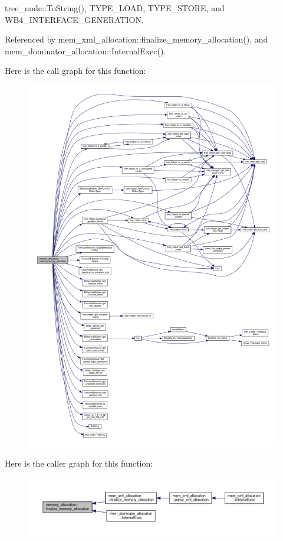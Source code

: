 tree\+\_\+node\+::\+To\+String(), T\+Y\+P\+E\+\_\+\+L\+O\+AD, T\+Y\+P\+E\+\_\+\+S\+T\+O\+RE, and W\+B4\+\_\+\+I\+N\+T\+E\+R\+F\+A\+C\+E\+\_\+\+G\+E\+N\+E\+R\+A\+T\+I\+ON.



Referenced by mem\+\_\+xml\+\_\+allocation\+::finalize\+\_\+memory\+\_\+allocation(), and mem\+\_\+dominator\+\_\+allocation\+::\+Internal\+Exec().

Here is the call graph for this function\+:
\nopagebreak
\begin{figure}[H]
\begin{center}
\leavevmode
\includegraphics[width=350pt]{db/d9f/classmemory__allocation_aef8d4eaba4caed7aaf19384e67efa6f5_cgraph}
\end{center}
\end{figure}
Here is the caller graph for this function\+:
\nopagebreak
\begin{figure}[H]
\begin{center}
\leavevmode
\includegraphics[width=350pt]{db/d9f/classmemory__allocation_aef8d4eaba4caed7aaf19384e67efa6f5_icgraph}
\end{center}
\end{figure}
